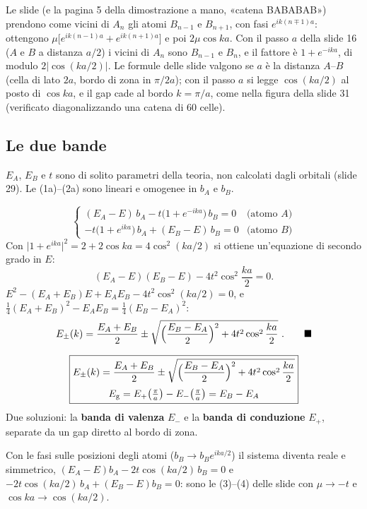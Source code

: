 \documentclass[11pt,a4paper]{article}
\begin{document}
\begin{osservazione}\label{oss:vicini}
Le slide (e la pagina 5 della dimostrazione a mano, «catena BABABAB») prendono come vicini di $A_n$ gli atomi $B_{n-1}$ e $B_{n+1}$, con fasi
$e^{ik(n\mp1)a}$: ottengono $\mu\bigl[e^{ik(n-1)a}+e^{ik(n+1)a}\bigr]$ e poi $2\mu\cos ka$. Con il passo $a$ della slide 16 ($A$ e $B$ a distanza
$a/2$) i vicini di $A_n$ sono $B_{n-1}$ e $B_n$, e il fattore è $1+e^{-ika}$, di modulo $2|\cos(ka/2)|$. Le formule delle slide valgono se $a$ è la
distanza $A$--$B$ (cella di lato $2a$, bordo di zona in $\pi/2a$); con il passo $a$ si legge $\cos(ka/2)$ al posto di $\cos ka$, e il gap cade al bordo
$k=\pi/a$, come nella figura della slide 31 (verificato diagonalizzando una catena di 60 celle).
\end{osservazione}

\subsection{Le due bande}
$E_A$, $E_B$ e $t$ sono di solito parametri della teoria, non calcolati dagli orbitali (slide 29). Le (1a)--(2a) sono lineari e omogenee in $b_A$ e
$b_B$.
\begin{dimostrazione}
\[
\begin{cases}(E_A-E)\,b_A-t\bigl(1+e^{-ika}\bigr)\,b_B=0 & \text{(atomo $A$)}\\[3pt] -t\bigl(1+e^{ika}\bigr)\,b_A+(E_B-E)\,b_B=0 & \text{(atomo $B$)}\end{cases}
\]
Con $\bigl|1+e^{ika}\bigr|^2=2+2\cos ka=4\cos^2(ka/2)$ si ottiene un'equazione di secondo grado in $E$:
\[
(E_A-E)(E_B-E)-4t^2\cos^2\frac{ka}2=0 .
\]
$E^2-(E_A+E_B)E+E_AE_B-4t^2\cos^2(ka/2)=0$, e $\frac14(E_A+E_B)^2-E_AE_B=\frac14(E_B-E_A)^2$:
\[
E_\pm(k)=\frac{E_A+E_B}2\pm\sqrt{\Bigl(\frac{E_B-E_A}2\Bigr)^2+4t^2\cos^2\frac{ka}2}\ .\qed
\]
\end{dimostrazione}
\begin{chiave}
\[
\boxed{\begin{gathered}E_\pm(k)=\frac{E_A+E_B}2\pm\sqrt{\Bigl(\frac{E_B-E_A}2\Bigr)^2+4t^2\cos^2\frac{ka}2}\\[2pt]
E_{\mathrm g}=E_+\bigl(\tfrac\pi a\bigr)-E_-\bigl(\tfrac\pi a\bigr)=E_B-E_A\end{gathered}}
\]
Due soluzioni: la \textbf{banda di valenza} $E_-$ e la \textbf{banda di conduzione} $E_+$, separate da un gap diretto al bordo di zona.
\end{chiave}
Con le fasi sulle posizioni degli atomi ($b_B\to b_Be^{ika/2}$) il sistema diventa reale e simmetrico,
$(E_A-E)b_A-2t\cos(ka/2)\,b_B=0$ e $-2t\cos(ka/2)\,b_A+(E_B-E)b_B=0$: sono le (3)--(4) delle slide con $\mu\to-t$ e $\cos ka\to\cos(ka/2)$.
\end{document}
